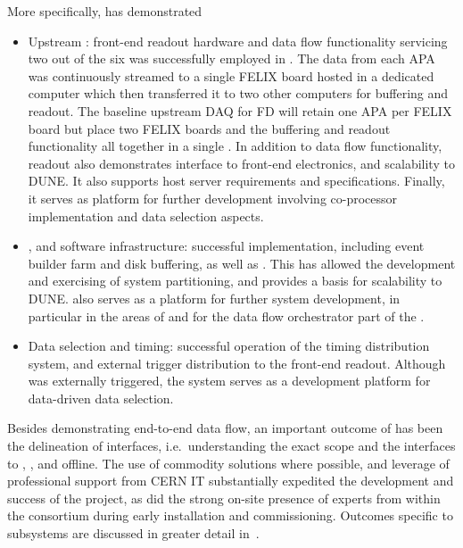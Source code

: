 More specifically,  has demonstrated 
\begin{itemize}
\item Upstream : front-end readout hardware and data flow functionality servicing two out of the six  was successfully employed in .
  The data from each APA was continuously streamed to a single FELIX board hosted in a dedicated computer which then transferred it to two other computers for buffering and readout.
  The baseline upstream DAQ for  FD will retain one APA per FELIX board but place two FELIX boards and the buffering and readout functionality all together in a single . 
  In addition to data flow functionality,   readout also demonstrates interface to front-end electronics, and scalability to DUNE. It also supports host server requirements and specifications. Finally, it serves as platform for further development involving co-processor implementation and data selection aspects.
\item {},  and software infrastructure:
 successful  implementation, including event builder
  farm and disk buffering, as well as . This has allowed the
  development and exercising of system partitioning, and provides a
  basis for scalability to DUNE.  also serves as
  a platform for further system development, in particular in the
  areas of  and for the data flow orchestrator part of the
  .
\item Data selection and timing:  successful operation of the timing
  distribution system, and external trigger distribution to the
  front-end readout. Although  was externally triggered, the
  system serves as a development platform for data-driven data selection.
\end{itemize}

Besides demonstrating end-to-end data flow, an important outcome of
  has been the delineation of
interfaces, i.e.~understanding the exact  scope and the interfaces to , , and offline. The use of commodity solutions
where possible, and leverage of professional support from CERN IT 
substantially expedited the development and success of the project, as
did the strong on-site presence of experts from within the consortium during early installation and
commissioning. 
Outcomes specific to  subsystems are discussed in
greater detail in~\cite{Hennessy:CDRReview}. 

